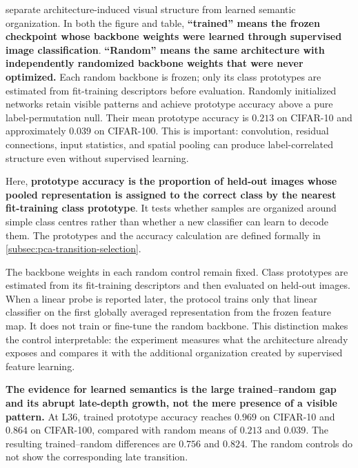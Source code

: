 

 separate
architecture-induced visual structure from learned semantic organization.
In both the figure and table, \textbf{``trained'' means the frozen checkpoint
whose backbone weights were learned through supervised image classification}.
\textbf{``Random'' means the same architecture with independently randomized
backbone weights that were never optimized.} Each random backbone is frozen;
only its class prototypes are estimated from fit-training descriptors before
evaluation.
Randomly initialized networks retain visible patterns and achieve prototype
accuracy above a pure label-permutation null. Their mean prototype accuracy is
$0.213$ on CIFAR-10 and approximately $0.039$ on CIFAR-100. This is important:
convolution, residual connections, input statistics, and spatial pooling can
produce label-correlated structure even without supervised learning.

Here, \textbf{prototype accuracy is the proportion of held-out images whose
pooled representation is assigned to the correct class by the nearest
fit-training class prototype}. It tests whether samples are organized around
simple class centres rather than whether a new classifier can learn to decode
them. The prototypes and the accuracy calculation are defined formally in
\cref{subsec:pca-transition-selection}.

The backbone weights in each random control remain fixed. Class prototypes are
estimated from its fit-training descriptors and then evaluated on held-out
images. When a linear probe is reported later, the protocol trains only that
linear classifier on the first globally averaged representation from the
frozen feature map. It does not train or fine-tune the random backbone. This
distinction makes the control interpretable: the experiment measures what the
architecture already exposes and compares it with the additional organization
created by supervised feature learning.

\textbf{The evidence for learned semantics is the large trained--random gap and
its abrupt late-depth growth, not the mere presence of a visible pattern.} At
L36, trained prototype accuracy reaches $0.969$ on CIFAR-10 and $0.864$ on
CIFAR-100, compared with random means of $0.213$ and $0.039$. The resulting
trained--random differences are $0.756$ and $0.824$. The random controls do not
show the corresponding late transition.

